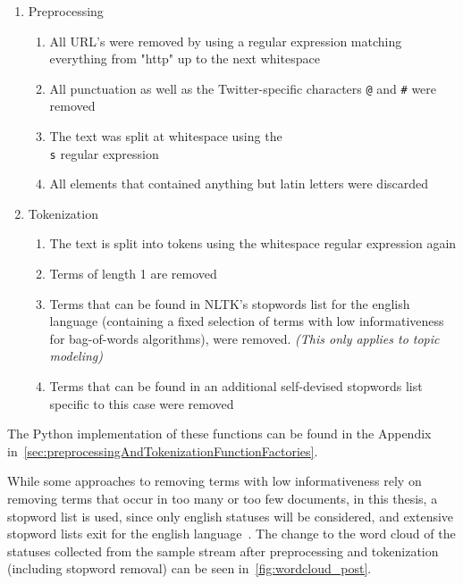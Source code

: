 \begin{enumerate}
    \item Preprocessing
    \begin{enumerate}
        \item All URL's were removed by using a regular expression matching everything from "http" up to the next whitespace
        \item All punctuation as well as the Twitter-specific characters \texttt{@} and \texttt{\#} were removed
        \item The text was split at whitespace using the \texttt{\\s} regular expression
        \item All elements that contained anything but latin letters were discarded
    \end{enumerate}
    \item Tokenization
    \begin{enumerate}
        \item The text is split into tokens using the whitespace regular expression again
        \item Terms of length 1 are removed
        \item Terms that can be found in NLTK's stopwords list for the english language
        (containing a fixed selection of terms with low informativeness for bag-of-words algorithms),
        were removed. \textit{(This only applies to topic modeling)}
        \item Terms that can be found in an additional self-devised stopwords list specific to this case were removed
    \end{enumerate}
\end{enumerate}

The Python implementation of these functions can be found in the Appendix in~\cref{sec:preprocessingAndTokenizationFunctionFactories}.

While some approaches to removing terms with low informativeness rely on removing terms that occur in too many or too few documents,
in this thesis, a stopword list is used,
since only english statuses will be considered, and extensive stopword lists exit for the english language~\cite{Porter2001}.
The change to the word cloud of the statuses collected from the sample stream after preprocessing and tokenization (including stopword removal) can be seen in~\cref{fig:wordcloud_post}.

